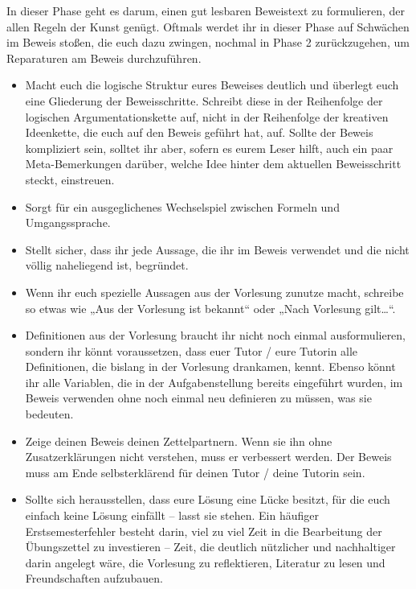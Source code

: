  
\begin{de}\label{beweisaufschreiben}
    In dieser Phase geht es darum, einen gut lesbaren Beweistext zu formulieren, der allen Regeln der Kunst genügt. Oftmals werdet ihr in dieser Phase auf Schwächen im Beweis stoßen, die euch dazu zwingen, nochmal in Phase 2 zurückzugehen, um Reparaturen am Beweis durchzuführen.
    \begin{itemize}
        \item Macht euch die logische Struktur eures Beweises deutlich und überlegt euch eine Gliederung der Beweisschritte. Schreibt diese in der Reihenfolge der logischen Argumentationskette auf, nicht in der Reihenfolge der kreativen Ideenkette, die euch auf den Beweis geführt hat, auf. Sollte der Beweis kompliziert sein, solltet ihr aber, sofern es eurem Leser hilft, auch ein paar Meta-Bemerkungen darüber, welche Idee hinter dem aktuellen Beweisschritt steckt, einstreuen.
        \item Sorgt für ein ausgeglichenes Wechselspiel zwischen Formeln und Umgangssprache.
        \item Stellt sicher, dass ihr jede Aussage, die ihr im Beweis verwendet und die nicht völlig naheliegend ist, begründet.
        \item Wenn ihr euch spezielle Aussagen aus der Vorlesung zunutze macht, schreibe so etwas wie „Aus der Vorlesung ist bekannt“ oder „Nach Vorlesung gilt\dots“.
        \item Definitionen aus der Vorlesung braucht ihr nicht noch einmal ausformulieren, sondern ihr könnt voraussetzen, dass euer Tutor / eure Tutorin alle Definitionen, die bislang in der Vorlesung drankamen, kennt. Ebenso könnt ihr alle Variablen, die in der Aufgabenstellung bereits eingeführt wurden, im Beweis verwenden ohne noch einmal neu definieren zu müssen, was sie bedeuten.
        \item Zeige deinen Beweis deinen Zettelpartnern. Wenn sie ihn ohne Zusatzerklärungen nicht verstehen, muss er verbessert werden. Der Beweis muss am Ende selbsterklärend für deinen Tutor / deine Tutorin sein.
        \item Sollte sich herausstellen, dass eure Lösung eine Lücke besitzt, für die euch einfach keine Lösung einfällt -- lasst sie stehen. Ein häufiger Erstsemesterfehler besteht darin, viel zu viel Zeit in die Bearbeitung der Übungszettel zu investieren -- Zeit, die deutlich nützlicher und nachhaltiger darin angelegt wäre, die Vorlesung zu reflektieren, Literatur zu lesen und Freundschaften aufzubauen.

\end{itemize}
\end{de}
